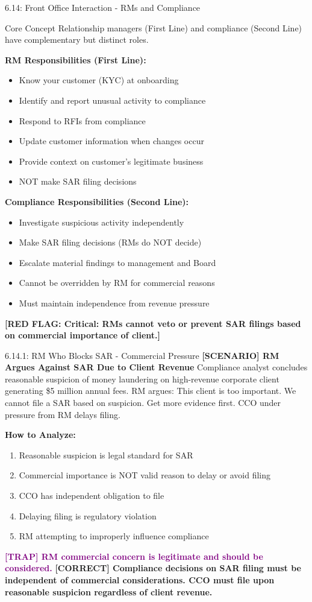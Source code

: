 \documentclass[11pt,a4paper]{beamer}
\newcommand{\trap}[1]{\textcolor{purple}{\textbf{[TRAP] #1}}}
\newcommand{\correct}[1]{\textcolor{green!50!black}{\textbf{[CORRECT] #1}}}
\newcommand{\scenario}[1]{\textcolor{blue!70!black}{\textbf{[SCENARIO] #1}}}
\newcommand{\redflag}[1]{\textcolor{red!80!black}{\textbf{[RED FLAG: #1]}}}
\begin{document}
\begin{frame}{6.14: Front Office Interaction - RMs and Compliance}
	\begin{block}{Core Concept}
		Relationship managers (First Line) and compliance (Second Line) have complementary but distinct roles.
	\end{block}
	\textbf{RM Responsibilities (First Line):}
	\begin{itemize}
		\item Know your customer (KYC) at onboarding
		\item Identify and report unusual activity to compliance
		\item Respond to RFIs from compliance
		\item Update customer information when changes occur
		\item Provide context on customer's legitimate business
		\item NOT make SAR filing decisions
	\end{itemize}
	\textbf{Compliance Responsibilities (Second Line):}
	\begin{itemize}
		\item Investigate suspicious activity independently
		\item Make SAR filing decisions (RMs do NOT decide)
		\item Escalate material findings to management and Board
		\item Cannot be overridden by RM for commercial reasons
		\item Must maintain independence from revenue pressure
	\end{itemize}
	\redflag{Critical: RMs cannot veto or prevent SAR filings based on commercial importance of client.}
\end{frame}

\begin{frame}{6.14.1: RM Who Blocks SAR - Commercial Pressure}
	\scenario{RM Argues Against SAR Due to Client Revenue}
	Compliance analyst concludes reasonable suspicion of money laundering on high-revenue corporate client generating \$5 million annual fees. RM argues: This client is too important. We cannot file a SAR based on suspicion. Get more evidence first. CCO under pressure from RM delays filing.
	
	\vspace{0.1cm}
	\textbf{How to Analyze:}
	\begin{enumerate}
		\item Reasonable suspicion is legal standard for SAR
		\item Commercial importance is NOT valid reason to delay or avoid filing
		\item CCO has independent obligation to file
		\item Delaying filing is regulatory violation
		\item RM attempting to improperly influence compliance
	\end{enumerate}
	\trap{RM commercial concern is legitimate and should be considered.}
	\correct{Compliance decisions on SAR filing must be independent of commercial considerations. CCO must file upon reasonable suspicion regardless of client revenue.}
\end{frame}
\end{document}
